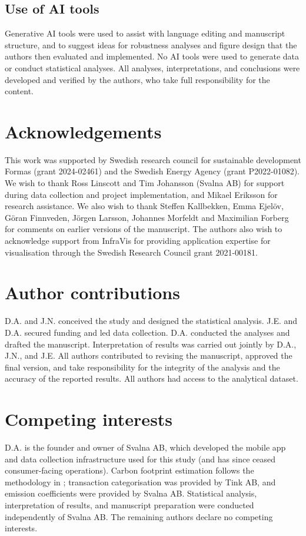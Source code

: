 \documentclass[sn-nature]{sn-jnl}
\begin{document}
\subsection{Use of AI tools}
Generative AI tools were used to assist with language editing and manuscript structure, and to suggest ideas for robustness analyses and figure design that the authors then evaluated and implemented. No AI tools were used to generate data or conduct statistical analyses. All analyses, interpretations, and conclusions were developed and verified by the authors, who take full responsibility for the content.

\section{Acknowledgements}
This work was supported by Swedish research council for sustainable development Formas (grant 2024-02461) and the Swedish Energy Agency (grant P2022-01082). We wish to thank Ross Linscott and Tim Johansson (Svalna AB) for support during data collection and project implementation, and Mikael Eriksson for research assistance. We also wish to thank Steffen Kallbekken, Emma Ejelöv, Göran Finnveden, Jörgen Larsson, Johannes Morfeldt and Maximilian Forberg for comments on earlier versions of the manuscript. The authors also wish to acknowledge support from InfraVis for providing application expertise for visualisation through the Swedish Research Council grant 2021-00181. 

\section{Author contributions}
D.A. and J.N. conceived the study and designed the statistical analysis. J.E. and D.A. secured funding and led data collection. D.A. conducted the analyses and drafted the manuscript. Interpretation of results was carried out jointly by D.A., J.N., and J.E. All authors contributed to revising the manuscript, approved the final version, and take responsibility for the integrity of the analysis and the accuracy of the reported results. All authors had access to the analytical dataset.

\section{Competing interests}
D.A. is the founder and owner of Svalna AB, which developed the mobile app and data collection infrastructure used for this study (and has since ceased consumer-facing operations). Carbon footprint estimation follows the methodology in \citep{andersson2020novel}; transaction categorisation was provided by Tink AB, and emission coefficients were provided by Svalna AB. Statistical analysis, interpretation of results, and manuscript preparation were conducted independently of Svalna AB. The remaining authors declare no competing interests.
\end{document}
